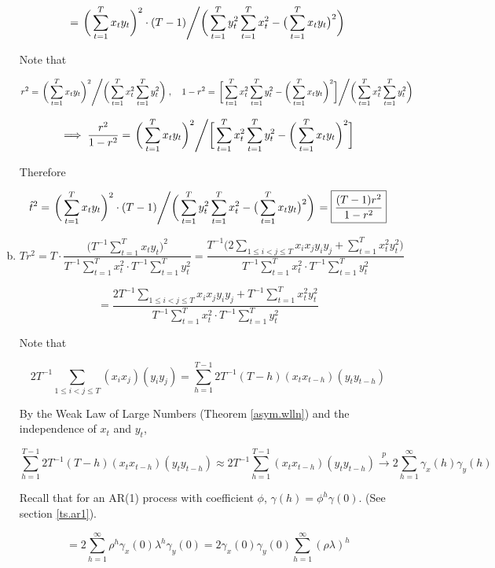 \begin{enumerate}[(a)]
\[
=  \left. \bigg(\sum_{t=1}^T x_t y_t \bigg)^2 \cdot (T-1) \middle/ \bigg( \sum_{t=1}^T  y_t^2 \sum_{t=1}^T x_t^2 -  \big(\sum_{t=1}^T x_t y_t \big)^2 \bigg) \right. 
\]

Note that

\[
r^2 = \left.  \bigg(\sum_{t=1}^T x_t y_t \bigg)^2 \middle/ \bigg( \sum_{t=1}^T x_t^2 \sum_{t=1}^T y_t^2 \bigg)  \right. , \ \ \ 1 - r^2 =   \left. \bigg[\sum_{t=1}^T x_t^2 \sum_{t=1}^T y_t^2  -  \bigg(\sum_{t=1}^T x_t y_t \bigg)^2 \bigg] \middle/ \bigg( \sum_{t=1}^T x_t^2 \sum_{t=1}^T y_t^2 \bigg)  \right. 
\]

\[
\implies \frac{r^2}{1-r^2} =  \left.  \bigg(\sum_{t=1}^T x_t y_t \bigg)^2 \middle/   \bigg[\sum_{t=1}^T x_t^2 \sum_{t=1}^T y_t^2  -  \bigg(\sum_{t=1}^T x_t y_t \bigg)^2 \bigg] \right. 
\]

Therefore

\[
\hat{t}^2 =  \left. \bigg(\sum_{t=1}^T x_t y_t \bigg)^2 \cdot (T-1) \middle/ \bigg( \sum_{t=1}^T  y_t^2 \sum_{t=1}^T x_t^2 -  \big(\sum_{t=1}^T x_t y_t \big)^2 \bigg) \right.   = \boxed{\frac{(T-1)r^2}{1 - r^2}}
\]

%
%
\item

\[
Tr^2 = T \cdot \frac{\big(T^{-1}\sum_{t=1}^T x_t y_t \big)^2}{T^{-1}\sum_{t=1}^T x_t^2 \cdot T^{-1} \sum_{t=1}^T y_t^2 } = \frac{T^{-1}\big(2 \sum_{1 \leq i < j \leq T} x_i x_j y_i y_j + \sum_{t=1}^T x_t^2y_t^2 \big)}{T^{-1}\sum_{t=1}^T x_t^2 \cdot T^{-1} \sum_{t=1}^T y_t^2 }
\]

\[
= \frac{2T^{-1} \sum_{1 \leq i < j \leq T} x_ix_j y_i y_j + T^{-1}\sum_{t=1}^T x_t^2y_t^2 }{T^{-1}\sum_{t=1}^T x_t^2 \cdot T^{-1} \sum_{t=1}^T y_t^2 }
\]

Note that 

\[
2T^{-1} \sum_{1 \leq i < j \leq T} (x_ix_j)( y_i y_j ) = \sum_{h=1}^{T-1} 2 T^{-1} (T-h)(x_t x_{t-h})(y_t y_{t-h})
\]

By the Weak Law of Large Numbers (Theorem \ref{asym.wlln}) and the independence of \(x_t\) and \(y_t\),

\[
\sum_{h=1}^{T-1} 2 T^{-1} (T-h)(x_t x_{t-h})(y_t y_{t-h}) \approx  2 T^{-1} \sum_{h=1}^{T-1}(x_t x_{t-h})(y_t y_{t-h}) \xrightarrow{p}2 \sum_{h=1}^{\infty}    \gamma_x(h) \gamma_y(h) 
\]

Recall that for an AR(1) process with coefficient \(\phi\), \(\gamma(h) = \phi^h \gamma(0)\). (See section \ref{ts.ar1}).

\[
= 2 \sum_{h=1}^{\infty}  \rho^h \gamma_x(0) \lambda^h \gamma_y(0)  = 2 \gamma_x(0) \gamma_y(0)   \sum_{h=1}^{\infty}    (\rho \lambda)^h 
\]


\end{enumerate}
